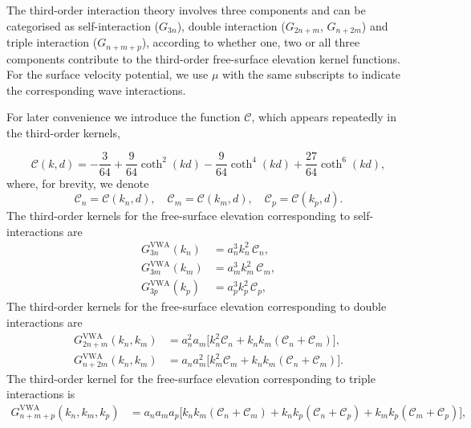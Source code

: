 \documentclass[lineno]{JFM-FLM_Au}
\begin{document}
\begin{appen}
The third-order interaction theory \citep{madsen2006third,madsen2012third} involves three components and can be
categorised as self-interaction ($G_{3n}$), double interaction ($G_{2n+m}$, $G_{n+2m}$) and triple interaction
($G_{n+m+p}$), according to whether one, two or all three components contribute to the third-order free-surface
elevation kernel functions. For the surface velocity potential, we use $\mu$ with the same subscripts to indicate the corresponding wave interactions.

For later convenience we introduce the function $\mathcal{C}$, which appears repeatedly in the third-order kernels,

\begin{equation}
  \mathcal{C}(k,d)
  = -\frac{3}{64}
    + \frac{9}{64}\coth^{2}(k d)
    - \frac{9}{64}\coth^{4}(k d)
    + \frac{27}{64}\coth^{6}(k d),
\end{equation}
where, for brevity, we denote
\begin{equation}
  \mathcal{C}_n = \mathcal{C}(k_n,d),\quad
  \mathcal{C}_m = \mathcal{C}(k_m,d),\quad
  \mathcal{C}_p = \mathcal{C}(k_p,d).
\end{equation}
The third-order kernels for the free-surface elevation corresponding to self-interactions are
\begin{equation}
\begin{aligned}
  G_{3n}^{\mathrm{VWA}}(k_n) &= a_n^{3} k_n^{2}\,\mathcal{C}_n, \\
  G_{3m}^{\mathrm{VWA}}(k_m) &= a_m^{3} k_m^{2}\,\mathcal{C}_m, \\
  G_{3p}^{\mathrm{VWA}}(k_p) &= a_p^{3} k_p^{2}\,\mathcal{C}_p,
\end{aligned}
\end{equation}
The third-order kernels for the free-surface elevation corresponding to double interactions are
\begin{equation}
\begin{aligned}
  G_{2n+m}^{\mathrm{VWA}}(k_n,k_m)
  &= a_n^{2} a_m\Big[
      k_n^{2}\mathcal{C}_n
    + k_n k_m(\mathcal{C}_n + \mathcal{C}_m)
  \Big],\\
  G_{n+2m}^{\mathrm{VWA}}(k_n,k_m)
  &= a_n a_m^{2}\Big[
      k_m^{2}\mathcal{C}_m
    + k_n k_m(\mathcal{C}_n + \mathcal{C}_m)
  \Big].
\end{aligned}
\end{equation}
The third-order kernel for the free-surface elevation corresponding to triple interactions is
\begin{equation}
\begin{aligned}
  G_{n+m+p}^{\mathrm{VWA}}(k_n,k_m,k_p)
  &= a_n a_m a_p \Big[
      k_n k_m(\mathcal{C}_n + \mathcal{C}_m)
    + k_n k_p(\mathcal{C}_n + \mathcal{C}_p)
    + k_m k_p(\mathcal{C}_m + \mathcal{C}_p)
  \Big],
\end{aligned}
\end{equation}


\end{appen}
\end{document}
